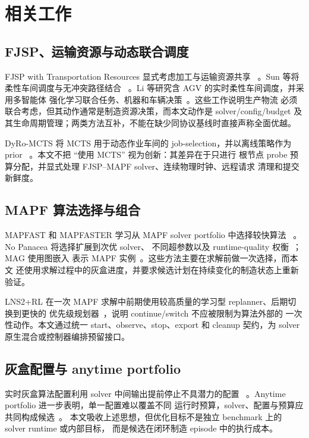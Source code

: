 \documentclass[11pt,a4paper]{article}
\begin{document}
\section{相关工作}
\label{sec:related}

\subsection{FJSP、运输资源与动态联合调度}

FJSP with Transportation Resources 显式考虑加工与运输资源共享
~\citep{berterottiere2024fjsptransport}。Sun 等将柔性车间调度与无冲突路径结合
~\citep{sun2023integrated}。Li 等研究含 AGV 的实时柔性车间调度，并采用多智能体
强化学习联合任务、机器和车辆决策~\citep{li2025realtime}。这些工作说明生产物流
必须联合考虑，但其动作通常是制造资源决策，而本文动作是 solver/config/budget
及其生命周期管理；两类方法互补，不能在缺少同协议基线时直接声称全面优越。

DyRo-MCTS 将 MCTS 用于动态作业车间的 job-selection，并以离线策略作为 prior
~\citep{chen2025dyromcts}。本文不把 ``使用 MCTS'' 视为创新：其差异在于只进行
根节点 probe 预算分配，并显式处理 FJSP--MAPF solver、连续物理时钟、远程请求
清理和提交新鲜度。

\subsection{MAPF 算法选择与组合}

MAPFAST 和 MAPFASTER 学习从 MAPF solver portfolio 中选择较快算法
~\citep{ren2021mapfast,alkazzi2022mapfaster}。No Panacea 将选择扩展到次优 solver、
不同超参数以及 runtime-quality 权衡~\citep{chen2024nopanacea}；MAG 使用图嵌入
表示 MAPF 实例~\citep{shabalin2024mag}。这些方法主要在求解前做一次选择，而本文
还使用求解过程中的灰盒进度，并要求候选计划在持续变化的制造状态上重新验证。

LNS2+RL 在一次 MAPF 求解中前期使用较高质量的学习型 replanner、后期切换到更快的
优先级规划器~\citep{wang2025lns2rl}，说明 continue/switch 不应被限制为算法外部的
一次性动作。本文通过统一 start、observe、stop、export 和 cleanup 契约，为 solver
原生混合或控制器编排预留接口。

\subsection{灰盒配置与 anytime portfolio}

实时灰盒算法配置利用 solver 中间输出提前停止不具潜力的配置
~\citep{weiss2025graybox}。Anytime portfolio 进一步表明，单一配置难以覆盖不同
运行时预算，solver、配置与预算应共同构成候选~\citep{schede2026anytime}。
本文吸收上述思想，但优化目标不是独立 benchmark 上的 solver runtime 或内部目标，
而是候选在闭环制造 episode 中的执行成本。
\end{document}
